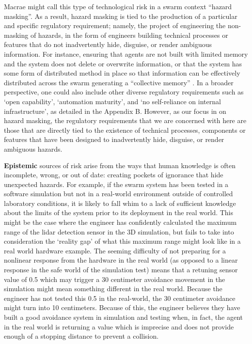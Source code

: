 \documentclass[lettersize,journal]{IEEEtran}
\begin{document}
Macrae \cite{macrae2021learning} might call this type of technological risk in a swarm context ``hazard masking”. As a result, hazard masking is tied to the production of a particular and specific regulatory requirement; namely, the project of engineering the non-masking of hazards, in the form of engineers building technical processes or features that do not inadvertently hide, disguise, or render ambiguous information. For instance, ensuring that agents are not built with limited memory and the system does not delete or overwrite information, or that the system has some form of distributed method in place so that information can be effectively distributed across the swarm generating a ``collective memory” \cite{wilson2022information}. In a broader perspective, one could also include other diverse regulatory requirements such as `open capability’, `automation maturity’, and `no self-reliance on internal infrastructure’, as detailed in the Appendix B. However, as our focus in on hazard masking, the regulatory requirements that we are concerned with here are those that are directly tied to the existence of technical processes, components or features that have been designed to inadvertently hide, disguise, or render ambiguous hazards.

\textbf{Epistemic} sources of risk arise from the ways that human knowledge is often incomplete, wrong, or out of date: creating pockets of ignorance that hide unexpected hazards. For example, if the swarm system has been tested in a software simulation but not in a real-world environment outside of controlled laboratory conditions, it is likely to fall whim to a lack of sufficient knowledge about the limits of the system prior to its deployment in the real world. This might be the case where the engineer has confidently calculated the maximum range of the lidar detection sensor in the 3D simulation, but fails to take into consideration the `reality gap’ of what this maximum range might look like in a real world hardware example. The seeming difficulty of not preparing for a nonlinear response from the hardware in the real world (as opposed to a linear response in the safe world of the simulation test) means that a retuning sensor value of 0.5 which may trigger a 30 centimeter avoidance movement in the simulation might mean something different in the real world. Because the engineer has not tested this 0.5 in the real-world, the 30 centimeter avoidance might turn into 10 centimeters. Because of this, the engineer believes they have built a good avoidance system in simulation and testing when, in fact, the agent in the real world is returning a value which is imprecise and does not provide enough of a stopping distance to prevent a collision. 
\end{document}
